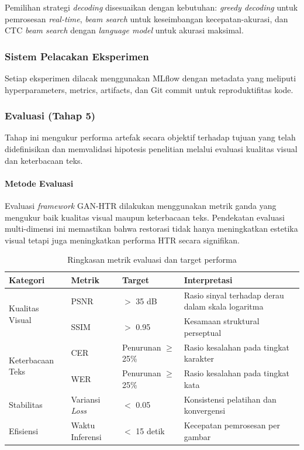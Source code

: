 \documentclass[12pt,a4paper]{article}
\begin{document}
Pemilihan strategi \textit{decoding} disesuaikan dengan kebutuhan: \textit{greedy decoding} untuk pemrosesan \textit{real-time}, \textit{beam search} untuk keseimbangan kecepatan-akurasi, dan CTC \textit{beam search} dengan \textit{language model} untuk akurasi maksimal.

\subsubsection{Sistem Pelacakan Eksperimen}
Setiap eksperimen dilacak menggunakan MLflow dengan metadata yang meliputi hyperparameters, metrics, artifacts, dan Git commit untuk reproduktifitas kode.

\subsubsection{Evaluasi (Tahap 5)}
Tahap ini mengukur performa artefak secara objektif terhadap tujuan yang telah didefinisikan dan memvalidasi hipotesis penelitian melalui evaluasi kualitas visual dan keterbacaan teks.

\paragraph{Metode Evaluasi}

Evaluasi \textit{framework} GAN-HTR dilakukan menggunakan metrik ganda yang mengukur baik kualitas visual maupun keterbacaan teks. Pendekatan evaluasi multi-dimensi ini memastikan bahwa restorasi tidak hanya meningkatkan estetika visual tetapi juga meningkatkan performa HTR secara signifikan.

\begin{table}[H]
\centering
\caption{Ringkasan metrik evaluasi dan target performa}
\label{tab:evaluation-metrics-summary}
\small
\begin{tabular}{|l|l|l|p{5cm}|}
\hline
\textbf{Kategori} & \textbf{Metrik} & \textbf{Target} & \textbf{Interpretasi} \\ \hline
\multirow{2}{*}{Kualitas Visual} & PSNR & $>$ 35 dB & Rasio sinyal terhadap derau dalam skala logaritma \\ \cline{2-4}
 & SSIM & $>$ 0.95 & Kesamaan struktural perseptual \\ \hline
\multirow{2}{*}{Keterbacaan Teks} & CER & Penurunan $\geq$ 25\% & Rasio kesalahan pada tingkat karakter \\ \cline{2-4}
 & WER & Penurunan $\geq$ 25\% & Rasio kesalahan pada tingkat kata \\ \hline
Stabilitas & Variansi \textit{Loss} & $<$ 0.05 & Konsistensi pelatihan dan konvergensi \\ \hline
Efisiensi & Waktu Inferensi & $<$ 15 detik & Kecepatan pemrosesan per gambar \\ \hline
\end{tabular}
\end{table}
\end{document}

